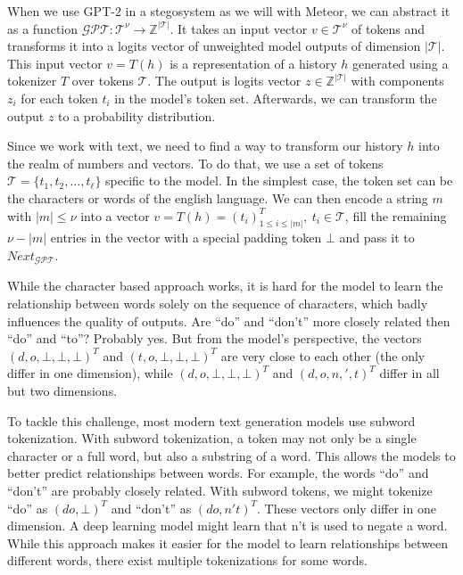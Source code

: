 When we use GPT-2 in a stegosystem as we will with Meteor, we can abstract it as a function $\mathcal{GPT} \colon \mathcal{T}^\nu \rightarrow \mathbb{Z}^{|\mathcal{T}|}$.
It takes an input vector $v \in \mathcal{T}^\nu$ of tokens and transforms it into a logits vector of unweighted model outputs of dimension $|\mathcal{T}|$.
This input vector $v=T(h)$ is a representation of a history $h$ generated using a tokenizer $T$ over tokens $\mathcal{T}$.
The output is logits vector $z \in \mathbb{Z}^{|\mathcal{T}|}$ with components $z_i$ for each token $t_i$ in the model's token set.
Afterwards, we can transform the output $z$ to a probability distribution.

Since we work with text, we need to find a way to transform our history $h$ into the realm of numbers and vectors.
To do that, we use a set of tokens $\mathcal{T} = \{ t_1, t_2, \dots, t_\ell \}$ specific to the model.
In the simplest case, the token set can be the characters or words of the english language.
We can then encode a string $m$ with $|m| \leq \nu$ into a vector $v = T(h) = \left(t_i\right)^T_{1 \leq i \leq |m|}, ~t_i \in \mathcal{T}$, fill the remaining $\nu - |m|$ entries in the vector with a special padding token $\bot$ and pass it to $Next_{\mathcal{GPT}}$.

	
While the character based approach works, it is hard for the model to learn the relationship between words solely on the sequence of characters, which badly influences the quality of outputs.
Are ``do'' and ``don't'' more closely related then ``do'' and ``to''?
Probably yes.
But from the model's perspective, the vectors $(d, o, \bot, \bot, \bot)^T$ and $(t, o, \bot, \bot, \bot)^T$ are very close to each other (the only differ in one dimension), while $(d, o, \bot, \bot, \bot)^T$ and $(d, o, n, ', t)^T$ differ in all but two dimensions.

To tackle this challenge, most modern text generation models use subword tokenization. 
With subword tokenization, a token may not only be a single character or a full word, but also a substring of a word.
This allows the models to better predict relationships between words.
For example, the words ``do'' and ``don't'' are probably closely related.
With subword tokens, we might tokenize ``do'' as $(do, \bot)^T$ and ``don't'' as $(do, n't)^T$.
These vectors only differ in one dimension.
A deep learning model might learn that n't is used to negate a word.
While this approach makes it easier for the model to learn relationships between different words, there exist multiple tokenizations for some words.

